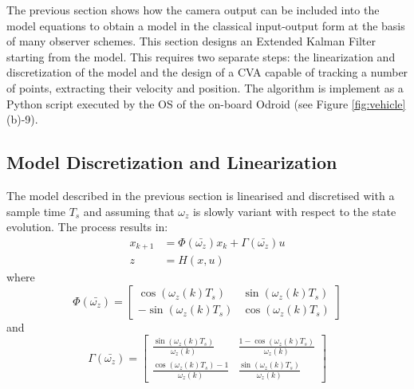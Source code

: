 \documentclass[letterpaper, 10 pt, conference]{ieeeconf}
\begin{document}
The previous section shows how the camera output can be included into the model equations to obtain a model in the classical input-output form at the basis of many observer schemes. This section designs an Extended Kalman Filter  starting from the model. This requires two separate steps: the linearization and discretization of the model and the design of a CVA capable of tracking a number of points, extracting their velocity and position.  The algorithm is implement as a Python script executed by the OS of the on-board Odroid (see Figure \ref{fig:vehicle}(b)-9). 

\subsection{Model Discretization and Linearization}
The model described in the previous section is linearised and discretised with a sample time $T_s$ and assuming that $\omega_z$ is slowly variant with respect to the state evolution. The process results in:
\begin{align}
x_{k+1} & = \Phi\left(\bar{\omega_z} \right) x_k + \Gamma \left(\bar{\omega_z} \right) u  \nonumber \\
z & = H(x,u) \nonumber 
\end{align}
where
\begin{equation}\label{eq:Phi}
\Phi \left( \bar{\omega_z} \right)= \left[ {\begin{array}{*{20}{c}}
  {\cos \left( {{\omega _z}\left( k \right){T_s}} \right)}&{\sin \left( {{\omega _z}\left( k \right){T_s}} \right)} \\ 
  { - \sin \left( {{\omega _z}\left( k \right){T_s}} \right)}&{\cos \left( {{\omega _z}\left( k \right){T_s}} \right)} 
\end{array}} \right]
\end{equation} 
and
\begin{equation}\label{eq:Gamma}
\Gamma \left(\bar{\omega_z} \right)= \left[ {\begin{array}{*{20}{c}}
  {\frac{{\sin \left( {{\omega _z}\left( k \right){T_s}} \right)}}{{{\omega _z}\left( k \right)}}}&{\frac{{1 - \cos \left( {{\omega _z}\left( k \right){T_s}} \right)}}{{{\omega _z}\left( k \right)}}} \\ 
  {\frac{{\cos \left( {{\omega _z}\left( k \right){T_s}} \right) - 1}}{{{\omega _z}\left( k \right)}}}&{\frac{{\sin \left( {{\omega _z}\left( k \right){T_s}} \right)}}{{{\omega _z}\left( k \right)}}} 
\end{array}} \right]
\end{equation}
\end{document}
